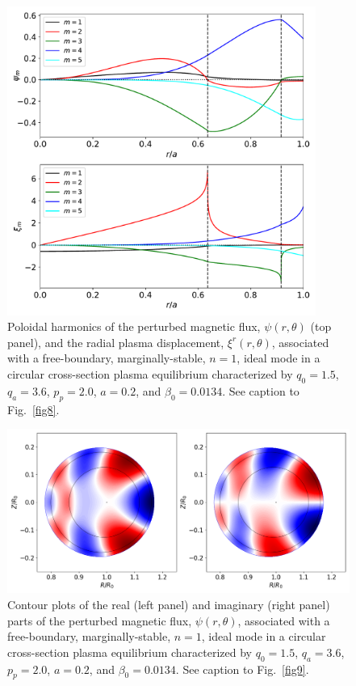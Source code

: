 \documentclass[12pt,prb,aps]{revtex4-1}
\begin{document}
\begin{figure}
\centerline{\includegraphics[width=0.9\textwidth]{Fig11.pdf}}
\caption{Poloidal harmonics of the perturbed magnetic flux, $\psi(r,\theta)$ (top panel), and the radial plasma displacement, $\xi^r(r,\theta)$,  associated with a free-boundary, 
marginally-stable, $n=1$, ideal mode in a circular cross-section plasma equilibrium characterized by $q_0=1.5$, $q_a= 3.6$, $p_p=2.0$, 
$a=0.2$, and $\beta_0=0.0134$. See caption to Fig.~\ref{fig8}.\label{fig11}}
\end{figure}

\begin{figure}
\centerline{\includegraphics[width=\textwidth]{Fig12.png}}
\caption{Contour plots of the real (left panel) and imaginary (right panel) parts of the perturbed magnetic flux, $\psi(r,\theta)$, associated with a free-boundary,
marginally-stable, $n=1$, ideal mode in a 
circular cross-section plasma equilibrium characterized by $q_0=1.5$, $q_a= 3.6$, $p_p=2.0$, 
$a=0.2$, and $\beta_0=0.0134$. See caption to Fig.~\ref{fig9}. \label{fig12}}
\end{figure}
\end{document}
